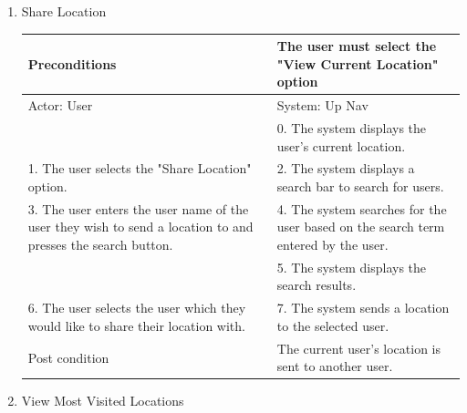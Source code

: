 \documentclass{article}
\begin{document}
\begin{center}
\begin{enumerate}
\begin{enumerate}
	\item{Share Location}

	\begin{table}[]
	\centering
		\begin{tabular}{ | m{15em} | m{15em}| }
		\hline
		Preconditions                                                                                                						& The user must select the "View Current Location" option \\ 
		\hline
		Actor: User                                                                                                						 	& System: Up Nav \\ 
		\hline
                                                                                                            									& 0. The system displays the user's current location. \\ 
		\hline
		1. The user selects the "Share Location" option.                                                            					& 2. The system displays a search bar to search for users. \\
		\hline
		3. The user enters the user name of the user they wish to send a location to and presses the search button. 	& 4. The system searches for the user based on the search term entered by the user. \\ 
		\hline
                                                                                                            									& 5. The system displays the search results. \\ 
		\hline
		6. The user selects the user which they would like to share their location with.                            			& 7. The system sends a location to the selected user. \\ 
		\hline
		Post condition                                                                                               						& The current user's location is sent to another user. \\ 
		\hline
		\end{tabular}
	\end{table}

	\item{View Most Visited Locations}


\end{enumerate}
\end{enumerate}
\end{center}
\end{document}
